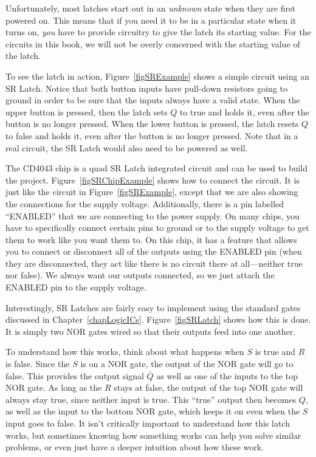 Unfortunately, most latches start out in an \emph{unknown} state when they are first powered on.
This means that if you need it to be in a particular state when it turns on, \emph{you} have to provide circuitry to give the latch its starting value.
For the circuits in this book, we will not be overly concerned with the starting value of the latch.


To see the latch in action, Figure~\ref{figSRExample} shows a simple circuit using an SR Latch.
Notice that both button inputs have pull-down resistors going to ground in order to be sure that the inputs always have a valid state.
When the upper button is pressed, then the latch sets $Q$ to true and holds it, even after the button is no longer pressed.
When the lower button is pressed, the latch resets $Q$ to false and holds it, even after the button is no longer pressed.
Note that in a real circuit, the SR Latch would also need to be powered as well.  

The CD4043 chip is a quad SR Latch integrated circuit and can be used to build the project.
Figure~\ref{figSRChipExample} shows how to connect the circuit.
It is just like the circuit in Figure~\ref{figSRExample}, except that we are also showing the connections for the supply voltage.
Additionally, there is a pin labelled ``ENABLED'' that we are connecting to the power supply.
On many chips, you have to specifically connect certain pins to ground or to the supply voltage to get them to work like you want them to.
On this chip, it has a feature that allows you to connect or disconnect all of the outputs using the ENABLED pin (when they are disconnected, they act like there is no circuit there at all---neither true nor false).
We always want our outputs connected, so we just attach the ENABLED pin to the supply voltage.


Interestingly, SR Latches are fairly easy to implement using the standard gates discussed in Chapter~\ref{chapLogicICs}.
Figure~\ref{figSRLatch} shows how this is done.
It is simply two NOR gates wired so that their outputs feed into one another.

To understand how this works, think about what happens when $S$ is true and $R$ is false.
Since the $S$ is on a NOR gate, the output of the NOR gate will go to false.
This provides the output signal $\bar{Q}$ as well as one of the inputs to the top NOR gate.
As long as the $R$ stays at false, the output of the top NOR gate will always stay true, since neither input is true.
This ``true'' output then becomes $Q$, as well as the input to the bottom NOR gate, which keeps it on even when the $S$ input goes to false.
It isn't critically important to understand how this latch works, but sometimes knowing how something works can help you solve similar problems, or even just have a deeper intuition about how these work.

